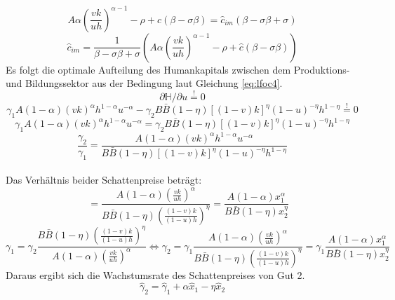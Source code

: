 \begin{equation*}
A \alpha \left(\frac{vk}{uh}\right)^{\alpha -1} - \rho + \hat{c} (\beta - \sigma\beta) = \hat{c}_{im}(\beta-\sigma\beta+ \sigma)
\end{equation*}
\begin{equation}
\boxed{\hat{c}_{im}=\frac{1}{\beta-\sigma\beta+ \sigma}\left(A\alpha \left(\frac{vk}{uh}\right)^{\alpha -1}-\rho+\hat{c}(\beta - \sigma\beta)\right)}\label{eq:lKRRim}
\end{equation}
\newpage
Es folgt die optimale Aufteilung des Humankapitals zwischen dem Produktions- und Bildungssektor aus der Bedingung laut Gleichung \eqref{eq:lfoc4}.
\begin{equation*}
\partial\mathbb{H}/\partial u\overset{!}{=}0
\end{equation*}
\begin{equation}
\gamma_1A(1-\alpha)(vk)^{\alpha}h^{1-\alpha}u^{-\alpha}-\gamma_2B\bar{B}(1-\eta)[(1-v)k]^\eta (1-u)^{-\eta} h^{1-\eta}\overset{!}{=}0
\end{equation}
\vspace{-0.7cm}
\begin{equation}
\gamma_1A(1-\alpha)(vk)^{\alpha}h^{1-\alpha}u^{-\alpha}=\gamma_2B\bar{B}(1-\eta)[(1-v)k]^\eta (1-u)^{-\eta} h^{1-\eta}\label{foc4}
\end{equation}
\begin{equation}
\frac{\gamma_2}{\gamma_1}=\frac{A(1-\alpha)(vk)^{\alpha}h^{1-\alpha}u^{-\alpha}}{B\bar{B}(1-\eta)[(1-v)k]^\eta (1-u)^{-\eta} h^{1-\eta}}
\end{equation}
\\
Das Verhältnis beider Schattenpreise beträgt: 
\begin{equation}
\quad~=\frac{A(1-\alpha)\left(\frac{vk}{uh}\right)^{\alpha}}{B\bar{B}(1-\eta)\left(\frac{(1-v)k}{(1-u)h}\right)^\eta}=\frac{A(1-\alpha)x_1^{\alpha}}{B\bar{B}(1-\eta)x_2^\eta}\label{Verhaltnisgleichung3}
\end{equation}
\begin{equation}
\gamma_1=\gamma_2\frac{B\bar{B}(1-\eta)\left(\frac{(1-v)k}{(1-u)h}\right)^\eta}{A(1-\alpha)\left(\frac{vk}{uh}\right)^{\alpha}}\Longleftrightarrow \gamma_2=\gamma_1 \frac {A(1-\alpha)\left(\frac{vk}{uh}\right)^{\alpha}}{B\bar{B}(1-\eta)\left(\frac{(1-v)k}{(1-u)h}\right)^\eta} = \gamma_1 \frac {A(1-\alpha)x_1^{\alpha}}{B\bar{B}(1-\eta)x_2^\eta}\label{Verhaltnisgleichung3b}
\end{equation}
Daraus ergibt sich die Wachstumsrate des Schattenpreises von Gut 2.
\begin{equation}
\hat{\gamma}_{2} = \hat{\gamma}_{1}+\alpha\hat{x}_1-\eta\hat{x}_2 \label{WachstumGamma2}
\end{equation}
